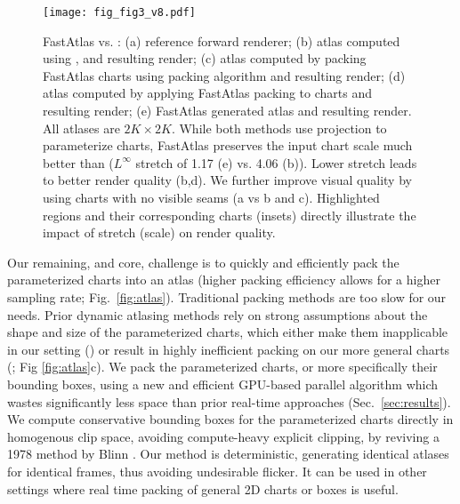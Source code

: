 \begin{figure*}
\texttt{[image: fig\_fig3\_v8.pdf]}
\vspace{-6pt}
\caption{
FastAtlas vs. \cite{Neff2022MSA}: (a) reference forward renderer; (b) atlas computed using \cite{Neff2022MSA}, and resulting render; (c) atlas computed by packing FastAtlas charts using \cite{Neff2022MSA} packing algorithm and resulting render; (d) atlas computed by applying FastAtlas packing to \cite{Neff2022MSA} charts and resulting render; (e) FastAtlas generated atlas and resulting render. All atlases are $2K \times 2K$. While both methods use projection to parameterize charts, FastAtlas  preserves the input chart scale much better than \cite{Neff2022MSA} ($L^{\infty}$ stretch of 1.17 (e) vs. 4.06 (b)). Lower stretch leads to better render quality (b,d). We further improve visual quality by using charts with no visible seams (a vs b and c). Highlighted regions and their corresponding charts (insets) directly illustrate the impact of stretch (scale) on render quality.}   
\label{fig:atlas}
\label{fig:san_miguel}
\end{figure*}

Our remaining, and core, challenge is to quickly and efficiently pack the parameterized charts into an atlas (higher packing efficiency allows for a higher sampling rate; Fig.~\ref{fig:atlas}). Traditional packing methods \cite{levy2002least,igarashi2001adaptive,Noll2011,sander2002signal} are too slow for our needs. Prior dynamic atlasing methods rely on strong assumptions about the shape and size of the parameterized charts, which either make them inapplicable in our setting (\cite{mueller2018shading,hladky2019tessellated,hladky2021snakebinning}) or result in highly inefficient packing on our more general charts (\cite{Neff2022MSA}; Fig \ref{fig:atlas}c). We pack the parameterized charts, or more specifically their bounding boxes, using a new and efficient GPU-based parallel algorithm which wastes significantly less space than prior real-time approaches (Sec.~\ref{sec:results}). We compute conservative bounding boxes for the parameterized charts directly in homogenous clip space, avoiding compute-heavy explicit clipping, by reviving a 1978 method by Blinn \cite{Blinn:CalculatingScreenCoverage}. Our method is deterministic, generating identical atlases for identical frames, thus avoiding undesirable flicker. It can be used in other settings where real time packing of general 2D charts or boxes is useful.

